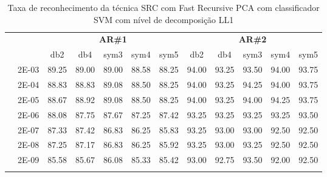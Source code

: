 \begin{table}[H]
\begin{tabular}{|c|c|c c c c c|c c c c c|}
	
\\\midrule
\end{tabular}

\end{table}



\begin{table}[H]
	\centering
    \normalsize
	\caption{Taxa de reconhecimento da técnica SRC com Fast Recursive PCA com classificador SVM com nível de decomposição LL1}
	\begin{tabular}{|c|c|c c c c c|c c c c c|}
\cline{3-12}
\multicolumn{2}{c|}{\multirow{2}{*}{}} & \multicolumn{5}{c|}{\textbf{AR\#1}}  & \multicolumn{5}{c|}{\textbf{AR\#2}} \\\cline{3-12}

\multicolumn{2}{c|}{}  & db2 & db4 & sym3 & sym4 & sym5 & db2 & db4& sym3 & sym4 & sym5 \\\hline
\multicolumn{1}{|c|}{ \multirow{6}{*}{\rotatebox[origin=c]{90}{\textbf{Gamma}}} }
&2E-03&	89.25&	89.00&	89.00&	88.58&	88.25&	94.00&	93.25&	93.50&	94.00&	93.75	\\\cline{2-12}
&2E-04&	88.83&	88.83&	89.08&	88.50&	88.25&	94.00&	93.25&	94.25&	94.00&	93.75	\\\cline{2-12}
&2E-05&	88.67&	88.92&	89.08&	88.50&	88.25&	94.00&	93.25&	94.00&	94.25&	93.75	\\\cline{2-12}
&2E-06&	88.08&	87.75&	87.67&	87.25&	87.42&	93.25&	93.25&	93.25&	93.25&	93.50	\\\cline{2-12}
&2E-07&	87.33&	87.42&	86.83&	86.25&	85.83&	93.25&	93.00&	93.00&	92.50&	92.50	\\\cline{2-12}
&2E-08&	87.25&	87.17&	86.83&	86.25&	85.92&	93.25&	93.00&	93.25&	92.50&	92.50	\\\cline{2-12}
&2E-09&	85.58&	85.67&	86.08&	85.33&	85.42&	93.00&	92.75&	93.50&	92.00&	92.50	
	
	



\\ \midrule
\multicolumn{12}{c}{}\\ 


\end{tabular}
\end{table}
